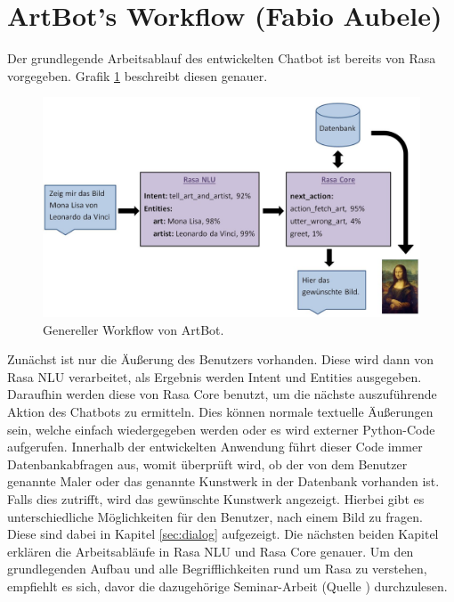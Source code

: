 \section{ArtBot's Workflow (Fabio Aubele)}\label{sec:flow}
Der grundlegende Arbeitsablauf des entwickelten Chatbot ist bereits von Rasa vorgegeben. Grafik \ref{flow} beschreibt diesen genauer.
\begin{figure}[htbp]
	\centerline{\includegraphics[width=1\linewidth]{figures/rasa_full.jpg}}
	\caption{Genereller Workflow von ArtBot.}
	\label{flow}
\end{figure}
Zunächst ist nur die Äußerung des Benutzers vorhanden. Diese wird dann von Rasa NLU verarbeitet, als Ergebnis werden Intent und Entities ausgegeben. Daraufhin werden diese von Rasa Core benutzt, um die nächste auszuführende Aktion des Chatbots zu ermitteln. Dies können normale textuelle Äußerungen sein, welche einfach wiedergegeben werden oder es wird externer Python-Code aufgerufen. Innerhalb der entwickelten Anwendung führt dieser Code immer Datenbankabfragen aus, womit überprüft wird, ob der von dem Benutzer genannte Maler oder das genannte Kunstwerk in der Datenbank vorhanden ist. Falls dies zutrifft, wird das gewünschte Kunstwerk angezeigt. Hierbei gibt es unterschiedliche Möglichkeiten für den Benutzer, nach einem Bild zu fragen. Diese sind dabei in Kapitel \ref{sec:dialog} aufgezeigt. Die nächsten beiden Kapitel erklären die Arbeitsabläufe in Rasa NLU und Rasa Core genauer. Um den grundlegenden Aufbau und alle Begrifflichkeiten rund um Rasa zu verstehen, empfiehlt es sich, davor die dazugehörige Seminar-Arbeit (Quelle \cite[S.9-11]{seminar}) durchzulesen.

